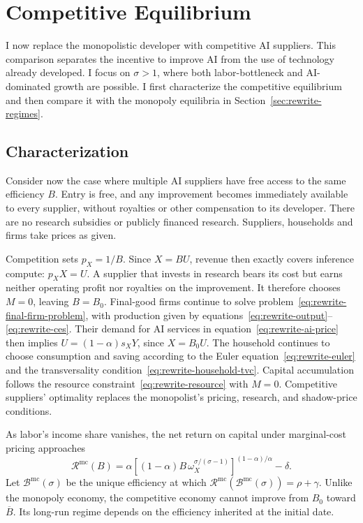 \section{Competitive Equilibrium}
\label{sec:rewrite-competition}

I now replace the monopolistic developer with competitive AI suppliers.
This comparison separates the incentive to improve AI from the use of
technology already developed. I focus on $\sigma>1$, where both
labor-bottleneck and AI-dominated growth are possible. I first characterize
the competitive equilibrium and then compare it with the monopoly
equilibria in Section~\ref{sec:rewrite-regimes}.

\subsection{Characterization}
\label{subsec:rewrite-competitive-equilibrium}

Consider now the case where multiple AI suppliers have free access to the same efficiency $B$. Entry is free,
and any improvement becomes immediately available to every supplier,
without royalties or other compensation to its developer. There are no
research subsidies or publicly financed research. Suppliers, households and firms
take prices as given. 

Competition sets $p_X=1/B$. Since $X=BU$, revenue then exactly covers
inference compute: $p_XX=U$. A supplier that invests in research bears
its cost but earns neither operating profit nor royalties on the
improvement. It therefore chooses $M=0$, leaving $B=B_0$.
Final-good firms continue to solve
problem~\eqref{eq:rewrite-final-firm-problem}, with production given by
equations~\eqref{eq:rewrite-output}--\eqref{eq:rewrite-ces}.
Their demand for AI services in equation~\eqref{eq:rewrite-ai-price}
then implies $U=(1-\alpha)s_XY$, since $X=B_0U$. The household continues to choose consumption and saving according to
the Euler equation~\eqref{eq:rewrite-euler} and the transversality
condition~\eqref{eq:rewrite-household-tvc}. Capital accumulation follows
the resource constraint~\eqref{eq:rewrite-resource} with $M=0$.
Competitive suppliers' optimality replaces
the monopolist's pricing, research, and shadow-price conditions.

As labor's income share vanishes, the net return on capital under
marginal-cost pricing approaches
\begin{equation}
 \mathcal R^{\mathrm{mc}}(B)
 =\alpha\left[(1-\alpha)B\,
 \omega_X^{\sigma/(\sigma-1)}\right]^{(1-\alpha)/\alpha}-\delta.
 \label{eq:rewrite-marginal-cost-return}
\end{equation}
Let $\mathcal B^{\mathrm{mc}}(\sigma)$ be the unique efficiency at which
$\mathcal R^{\mathrm{mc}}(\mathcal B^{\mathrm{mc}}(\sigma))=\rho+\gamma$.
Unlike the monopoly economy, the competitive economy cannot improve
from $B_0$ toward $\overline B$. Its long-run regime depends on the
efficiency inherited at the initial date.

